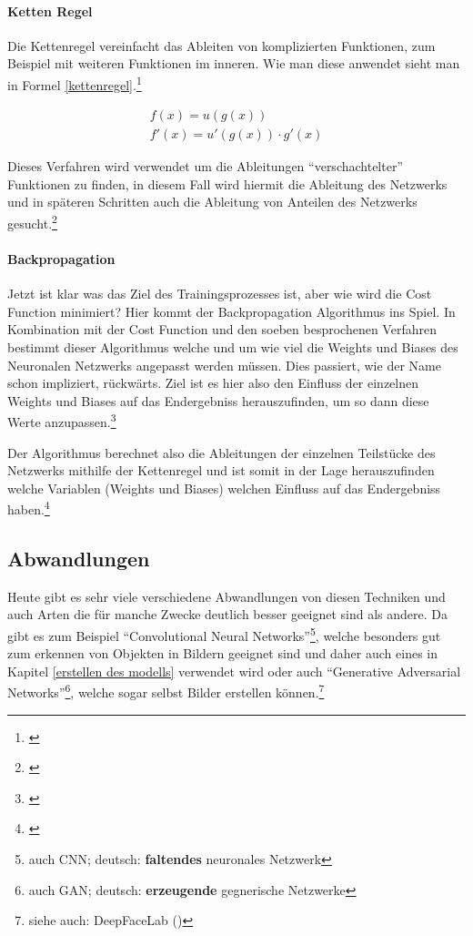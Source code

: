 \paragraph{Ketten Regel}\label{parachain}

Die Kettenregel vereinfacht das Ableiten von komplizierten Funktionen, zum Beispiel mit weiteren Funktionen im inneren. Wie man diese anwendet sieht man in Formel \ref{kettenregel}.\footnote{\cite{kettenregel}}

\begin{equation}\label{kettenregel}
    \begin{matrix}
        f(x) = u(g(x)) \\
        f'(x) = u'(g(x)) \cdot g'(x)
    \end{matrix}
\end{equation}

Dieses Verfahren wird verwendet um die Ableitungen "`verschachtelter"' Funktionen zu finden, in diesem Fall wird hiermit die Ableitung des Netzwerks und in späteren Schritten auch die Ableitung von Anteilen des Netzwerks gesucht.\footnote{\cite{chainruleml}}

\paragraph{Backpropagation}\label{backprop}

Jetzt ist klar was das Ziel des Trainingsprozesses ist, aber wie wird die Cost Function minimiert? Hier kommt der Backpropagation Algorithmus ins Spiel. In Kombination mit der Cost Function und den soeben besprochenen Verfahren bestimmt dieser Algorithmus welche und um wie viel die Weights und Biases des Neuronalen Netzwerks angepasst werden müssen. Dies passiert, wie der Name schon impliziert, rückwärts. Ziel ist es hier also den Einfluss der einzelnen Weights und Biases auf das Endergebniss herauszufinden, um so dann diese Werte anzupassen.\footnote{\cite{3blue1brown}}

Der Algorithmus berechnet also die Ableitungen der einzelnen Teilstücke des Netzwerks mithilfe der Kettenregel und ist somit in der Lage herauszufinden welche Variablen (Weights und Biases) welchen Einfluss auf das Endergebniss haben.\footnote{\cite{3blue1brown}}

\subsection{Abwandlungen}

Heute gibt es sehr viele verschiedene Abwandlungen von diesen Techniken und auch Arten die für manche Zwecke deutlich besser geeignet sind als andere. Da gibt es zum Beispiel "`Convolutional Neural Networks"'\footnote{auch CNN; deutsch: \textbf{faltendes} neuronales Netzwerk}, welche besonders gut zum erkennen von Objekten in Bildern geeignet sind und daher auch eines in Kapitel \ref{erstellen des modells} verwendet wird oder auch "`Generative Adversarial Networks"'\footnote{auch GAN; deutsch: \textbf{erzeugende} gegnerische Netzwerke}, welche sogar selbst Bilder erstellen können.\footnote{siehe auch: DeepFaceLab (\cite{deepfacelab})}

